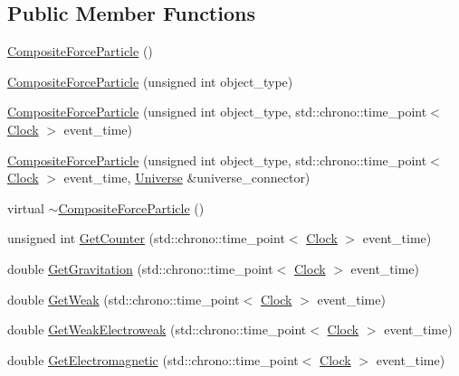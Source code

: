\subsection*{Public Member Functions}
\begin{DoxyCompactItemize}
\item 
\hyperlink{class_composite_force_particle_ae00ad8621af6155c86ee3205c1e2afdb}{Composite\+Force\+Particle} ()
\item 
\hyperlink{class_composite_force_particle_a967036ded4212fcd6d4213275145dc50}{Composite\+Force\+Particle} (unsigned int object\+\_\+type)
\item 
\hyperlink{class_composite_force_particle_a805886058bba3179de8142fd266883e4}{Composite\+Force\+Particle} (unsigned int object\+\_\+type, std\+::chrono\+::time\+\_\+point$<$ \hyperlink{universe_8h_a0ef8d951d1ca5ab3cfaf7ab4c7a6fd80}{Clock} $>$ event\+\_\+time)
\item 
\hyperlink{class_composite_force_particle_a8c311b3e35f6def3a532346a50c15281}{Composite\+Force\+Particle} (unsigned int object\+\_\+type, std\+::chrono\+::time\+\_\+point$<$ \hyperlink{universe_8h_a0ef8d951d1ca5ab3cfaf7ab4c7a6fd80}{Clock} $>$ event\+\_\+time, \hyperlink{class_universe}{Universe} \&universe\+\_\+connector)
\item 
virtual \hyperlink{class_composite_force_particle_aa35ee4244375b2bcc5dd775de30aa39e}{$\sim$\+Composite\+Force\+Particle} ()
\item 
unsigned int \hyperlink{class_composite_force_particle_ae0bc57309f04b784b2c23b82db869b25}{Get\+Counter} (std\+::chrono\+::time\+\_\+point$<$ \hyperlink{universe_8h_a0ef8d951d1ca5ab3cfaf7ab4c7a6fd80}{Clock} $>$ event\+\_\+time)
\item 
double \hyperlink{class_composite_force_particle_a06483dc73c156679f34acf85aa5f924e}{Get\+Gravitation} (std\+::chrono\+::time\+\_\+point$<$ \hyperlink{universe_8h_a0ef8d951d1ca5ab3cfaf7ab4c7a6fd80}{Clock} $>$ event\+\_\+time)
\item 
double \hyperlink{class_composite_force_particle_ab5cc0893a4063cc353ea5d2404f27b0b}{Get\+Weak} (std\+::chrono\+::time\+\_\+point$<$ \hyperlink{universe_8h_a0ef8d951d1ca5ab3cfaf7ab4c7a6fd80}{Clock} $>$ event\+\_\+time)
\item 
double \hyperlink{class_composite_force_particle_a27762218af4e3c021c89ff4792d81b41}{Get\+Weak\+Electroweak} (std\+::chrono\+::time\+\_\+point$<$ \hyperlink{universe_8h_a0ef8d951d1ca5ab3cfaf7ab4c7a6fd80}{Clock} $>$ event\+\_\+time)
\item 
double \hyperlink{class_composite_force_particle_a8ef336fed7e33d52a3baae4bd4dd32fd}{Get\+Electromagnetic} (std\+::chrono\+::time\+\_\+point$<$ \hyperlink{universe_8h_a0ef8d951d1ca5ab3cfaf7ab4c7a6fd80}{Clock} $>$ event\+\_\+time)

\end{DoxyCompactItemize}
